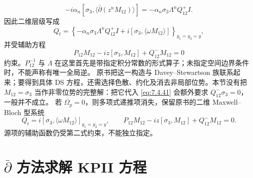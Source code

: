 \documentclass[lang=cn,scheme=chinese,mode=simple,device=normal,color=blue,math=cm,thmcnt=section,12pt]{elegantbook}
\newcommand{\eqq}[2]{\tag{#1}\label{eq:#1}#2}
\begin{document}
\begin{equation}
\eqq{7.4.39}{-i\alpha_n[\sigma_3,\langle\bar\partial(z^nM_{12})\rangle]
=-\alpha_n\sigma_3\Lambda^nQ_{12}^+I.}
\end{equation}
因此二维层级写成
\begin{equation}
\eqq{7.4.40}{Q_t=\left\{-\alpha_n\sigma_3\Lambda^nQ_{12}^+I+i[\sigma_3,\langle\omega M_{12}\rangle]\right\}_{y_1=y_2=y},}
\end{equation}
并受辅助方程
\begin{equation}
\eqq{7.4.41}{P_{12}M_{12}-iz[\sigma_3,M_{12}]+Q_{12}^-M_{12}=0}
\end{equation}
约束。$P_{12}^{-1}$ 与 $\Lambda$ 在这里首先是带指定积分常数的形式算子；未指定空间边界条件时，不能声称有唯一全局逆。
原书把这一构造与 Davey--Stewartson 族联系起来；要得到具体 DS 方程，还需选择色散、约化及消去非局部位势。本节没有把 $M_{12}=\sigma_3$ 当作非零位势的完整解：把它代入 \eqref{eq:7.4.41} 会额外要求 $Q_{12}^-\sigma_3=0$，一般并不成立。
若 $\Omega_p=0$，则多项式递推项消失，保留原书的二维 Maxwell--Bloch 型系统
\[
Q_t=i[\sigma_3,\langle\omega M_{12}\rangle]_{y_1=y_2=y},\qquad
P_{12}M_{12}-iz[\sigma_3,M_{12}]+Q_{12}^-M_{12}=0.
\]
源项的辅助函数仍受第二式约束，不能独立指定。

\section{\texorpdfstring{$\bar\partial$}{dbar} 方法求解 KPII 方程}
\end{document}
